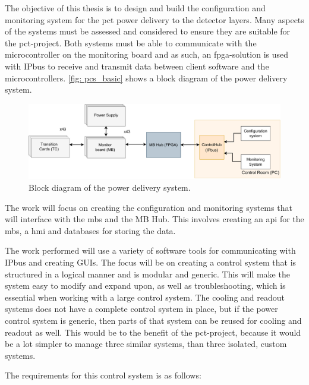 \documentclass[main.tex]{subfiles}
\begin{document}
The objective of this thesis is to design and build the configuration and monitoring system for the \gls{pct} power delivery to the detector layers. Many aspects of the systems must be assessed and considered to ensure they are suitable for the \gls{pct}-project. Both systems must be able to communicate with the microcontroller on the monitoring board and as such, an \acrshort{fpga}-solution is used with IPbus to receive and transmit data between client software and the microcontrollers. \autoref{fig: pcs_basic} shows a block diagram of the power delivery system.

\begin{figure}[!htpb]
    \centering
    \includegraphics[scale = 0.65]{images/PCS basic overview.pdf}
    \caption{Block diagram of the power delivery system.}
    \label{fig: pcs_basic}
\end{figure}
\FloatBarrier

The work will focus on creating the configuration and monitoring systems that will interface with the \gls{mb}s and the MB Hub. This involves creating an \gls{api} for the \gls{mb}s, a \gls{hmi} and databases for storing the data.

The work performed will use a variety of software tools for communicating with IPbus and creating GUIs. The focus will be on creating a control system that is structured in a logical manner and is modular and generic. This will make the system easy to modify and expand upon, as well as troubleshooting, which is essential when working with a large control system. The cooling and readout systems does not have a complete control system in place, but if the power control system is generic, then parts of that system can be reused for cooling and readout as well. This would be to the benefit of the \gls{pct}-project, because it would be a lot simpler to manage three similar systems, than three isolated, custom systems.


The requirements for this control system is as follows:
\end{document}
